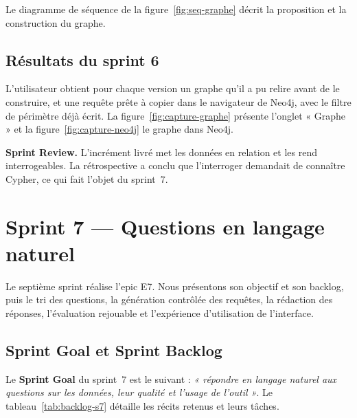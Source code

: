 Le diagramme de séquence de la figure~\ref{fig:seq-graphe} décrit la proposition et la construction du graphe.


\subsection{Résultats du sprint 6}

L'utilisateur obtient pour chaque version un graphe qu'il a pu relire avant de le construire, et une requête prête à copier dans le navigateur de Neo4j, avec le filtre de périmètre déjà écrit. La figure~\ref{fig:capture-graphe} présente l'onglet « Graphe » et la figure~\ref{fig:capture-neo4j} le graphe dans Neo4j.



\noindent\textbf{Sprint Review.} L'incrément livré met les données en relation et les rend interrogeables. La rétrospective a conclu que l'interroger demandait de connaître Cypher, ce qui fait l'objet du sprint~7.

\section{Sprint 7 — Questions en langage naturel}

Le septième sprint réalise l'epic E7. Nous présentons son objectif et son backlog, puis le tri des questions, la génération contrôlée des requêtes, la rédaction des réponses, l'évaluation rejouable et l'expérience d'utilisation de l'interface.

\subsection{Sprint Goal et Sprint Backlog}

Le \textbf{Sprint Goal} du sprint~7 est le suivant : \textit{« répondre en langage naturel aux questions sur les données, leur qualité et l'usage de l'outil »}. Le tableau~\ref{tab:backlog-s7} détaille les récits retenus et leurs tâches.

